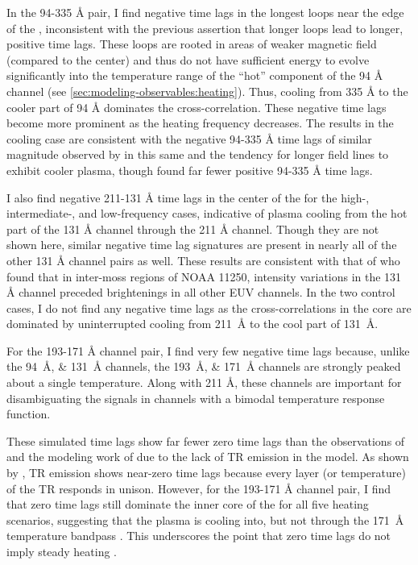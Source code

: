 In the 94-335 \si{\angstrom} pair, I find negative time lags in the longest loops near the edge of the \AR{}, inconsistent with the previous assertion that longer loops lead to longer, positive time lags. These loops are rooted in areas of weaker magnetic field (compared to the center) and thus do not have sufficient energy to evolve significantly into the temperature range of the ``hot'' component of the 94 \si{\angstrom} channel (see \autoref{sec:modeling-observables:heating}). Thus, cooling from 335 \si{\angstrom} to the cooler part of 94 \si{\angstrom} dominates the cross-correlation. These negative time lags become more prominent as the heating frequency decreases. The results in the cooling case are consistent with the negative 94-335 \si{\angstrom} time lags of similar magnitude observed by \citet{viall_survey_2017} in this same \AR{} and the tendency for longer field lines to exhibit cooler plasma, though \citeauthor{viall_survey_2017} found far fewer positive 94-335 \si{\angstrom} time lags.

I also find negative 211-131 \si{\angstrom} time lags in the center of the \AR{} for the high-, intermediate-, and low-frequency cases, indicative of plasma cooling from the hot part of the 131 \si{\angstrom} channel through the 211 \si{\angstrom} channel. Though they are not shown here, similar negative time lag signatures are present in nearly all of the other 131 \si{\angstrom} channel pairs as well. These results are consistent with that of \citet{cadavid_heating_2014} who found that in inter-moss regions of \AR{} NOAA 11250, intensity variations in the 131 \si{\angstrom} channel preceded brightenings in all other EUV channels. In the two control cases, I do not find any negative time lags as the cross-correlations in the core are dominated by uninterrupted cooling from \SI{211}{\angstrom} to the cool part of \SI{131}{\angstrom}.

For the 193-171 \si{\angstrom} channel pair, I find very few negative time lags because, unlike the \SIlist{94;131}{\angstrom} channels, the \SIlist{193;171}{\angstrom} channels are strongly peaked about a single temperature. Along with 211 \si{\angstrom}, these channels are important for disambiguating the signals in channels with a bimodal temperature response function.

These simulated time lags show far fewer zero time lags than the observations of \citet{viall_evidence_2012,viall_survey_2017} and the modeling work of \citet{bradshaw_patterns_2016} due to the lack of TR emission in the model. As shown by \citet{viall_transition_2015}, TR emission shows near-zero time lags because every layer (or temperature) of the TR responds in unison. However, for the 193-171 \si{\angstrom} channel pair, I find that zero time lags still dominate the inner core of the \AR{} for all five heating scenarios, suggesting that the plasma is cooling into, but not through the \SI{171}{\angstrom} temperature bandpass \citep{viall_survey_2017}. This underscores the point that zero time lags do not imply steady heating \citep{viall_transition_2015,viall_signatures_2016}.

